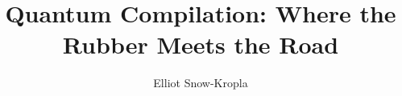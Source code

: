 \documentclass[12pt]{dalthesis}
\begin{document}
\title{Quantum Compilation: Where the Rubber Meets the Road}
\author{Elliot Snow-Kropla}



\nolistoftables

\frontmatter

\begin{abstract}

\end{abstract}

\begin{acknowledgements}
\end{acknowledgements}

\mainmatter













\end{document}
